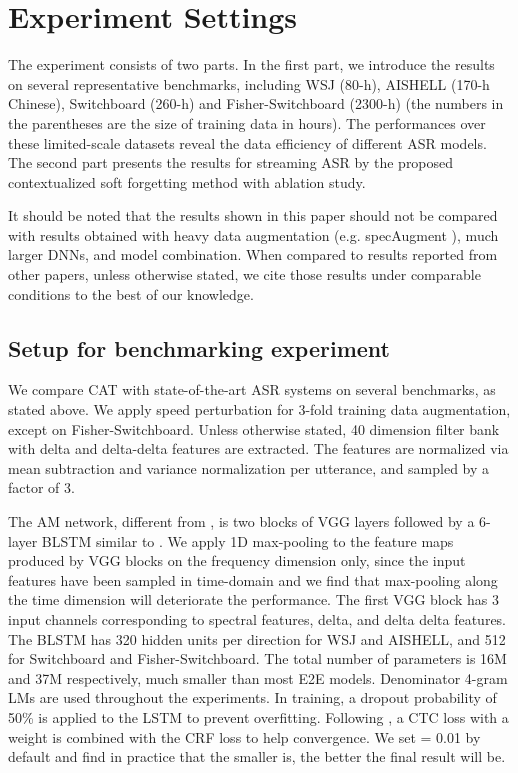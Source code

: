 \documentclass[a4paper]{article}
\begin{document}
\section{Experiment Settings}
The experiment consists of two parts. In the first part, we introduce the results on several representative benchmarks, including WSJ (80-h), AISHELL (170-h Chinese), Switchboard (260-h) and Fisher-Switchboard (2300-h) (the numbers in the parentheses are the size of training data in hours).
The performances over these limited-scale datasets reveal the data efficiency of different ASR models.
The second part presents the results for streaming ASR by the proposed contextualized soft forgetting method with ablation study.

It should be noted that the results shown in this paper should not be compared with results obtained with heavy data augmentation (e.g. specAugment \cite{specAugment}), much larger DNNs, and model combination.
When compared to results reported from other papers, unless otherwise stated, we cite those results under comparable conditions to the best of our knowledge.

\subsection{Setup for benchmarking experiment}
We compare CAT with state-of-the-art ASR systems on several benchmarks, as stated above. We apply speed perturbation for 3-fold training data augmentation, except on Fisher-Switchboard. Unless otherwise stated, 40 dimension filter bank with delta and delta-delta features are extracted. The features are normalized via mean subtraction and variance normalization per utterance, and sampled by a factor of 3.

The AM network, different from \cite{Xiang2019CRF}, is two blocks of VGG layers followed by a 6-layer BLSTM similar to \cite{Hori2017Advances}. We apply 1D max-pooling to the feature maps produced by VGG blocks on the frequency dimension only, since the input features have been sampled in time-domain and we find that max-pooling along the time dimension will deteriorate the performance. The first VGG block has 3 input channels corresponding to spectral features, delta, and delta delta features. The BLSTM has 320 hidden units per direction for WSJ and AISHELL, and 512 for Switchboard and Fisher-Switchboard. The total number of parameters is 16M and 37M respectively, much smaller than most E2E models. Denominator 4-gram LMs are used throughout the experiments. In training, a dropout \cite{Srivastava2014Dropout} probability of 50\% is applied to the LSTM to prevent overfitting. Following \cite{Xiang2019CRF}, a CTC loss with a weight  is combined with the CRF loss to help convergence. We set  = 0.01 by default and find in practice that the smaller  is, the better the final result will be.
\end{document}
